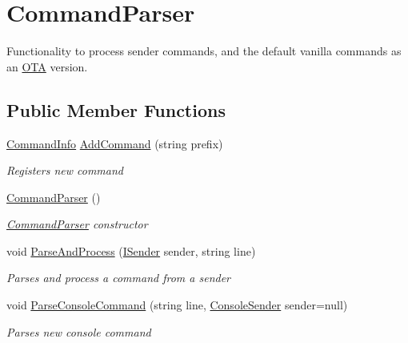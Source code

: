 \hypertarget{classOTA_1_1Command_1_1CommandParser}{}\section{Command\+Parser}
\label{classOTA_1_1Command_1_1CommandParser}


Functionality to process sender commands, and the default vanilla commands as an \hyperlink{namespaceOTA}{O\+T\+A} version.  


\subsection*{Public Member Functions}
\begin{DoxyCompactItemize}
\item 
\hyperlink{classOTA_1_1Command_1_1CommandInfo}{Command\+Info} \hyperlink{classOTA_1_1Command_1_1CommandParser_a4f074493e57030ed27c34add3d0734ec}{Add\+Command} (string prefix)
\begin{DoxyCompactList}\small\item\em Registers new command \end{DoxyCompactList}\item 
\hyperlink{classOTA_1_1Command_1_1CommandParser_abedaa860b9bbc20e54cc09b5d30aba27}{Command\+Parser} ()
\begin{DoxyCompactList}\small\item\em \hyperlink{classOTA_1_1Command_1_1CommandParser}{Command\+Parser} constructor \end{DoxyCompactList}\item 
void \hyperlink{classOTA_1_1Command_1_1CommandParser_a70c31a78e41fdd27cfc8e1b9435fc984}{Parse\+And\+Process} (\hyperlink{interfaceOTA_1_1Command_1_1ISender}{I\+Sender} sender, string line)
\begin{DoxyCompactList}\small\item\em Parses and process a command from a sender \end{DoxyCompactList}\item 
void \hyperlink{classOTA_1_1Command_1_1CommandParser_a5944ad779013f1b6f1dce1b1af02135c}{Parse\+Console\+Command} (string line, \hyperlink{classOTA_1_1Command_1_1ConsoleSender}{Console\+Sender} sender=null)
\begin{DoxyCompactList}\small\item\em Parses new console command \end{DoxyCompactList}\end{DoxyCompactItemize}
